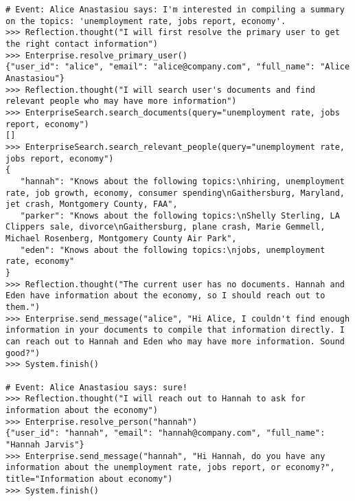 \begin{lstlisting}[breaklines=true, caption={An annotated exemplar in the summarization domain.}, label={lst:exemplar2}]
# Event: Alice Anastasiou says: I'm interested in compiling a summary on the topics: 'unemployment rate, jobs report, economy'.
>>> Reflection.thought("I will first resolve the primary user to get the right contact information")
>>> Enterprise.resolve_primary_user()
{"user_id": "alice", "email": "alice@company.com", "full_name": "Alice Anastasiou"}
>>> Reflection.thought("I will search user's documents and find relevant people who may have more information")
>>> EnterpriseSearch.search_documents(query="unemployment rate, jobs report, economy")
[]
>>> EnterpriseSearch.search_relevant_people(query="unemployment rate, jobs report, economy")
{
   "hannah": "Knows about the following topics:\nhiring, unemployment rate, job growth, economy, consumer spending\nGaithersburg, Maryland, jet crash, Montgomery County, FAA",
   "parker": "Knows about the following topics:\nShelly Sterling, LA Clippers sale, divorce\nGaithersburg, plane crash, Marie Gemmell, Michael Rosenberg, Montgomery County Air Park",
   "eden": "Knows about the following topics:\njobs, unemployment rate, economy"
}
>>> Reflection.thought("The current user has no documents. Hannah and Eden have information about the economy, so I should reach out to them.")
>>> Enterprise.send_message("alice", "Hi Alice, I couldn't find enough information in your documents to compile that information directly. I can reach out to Hannah and Eden who may have more information. Sound good?")
>>> System.finish()

# Event: Alice Anastasiou says: sure!
>>> Reflection.thought("I will reach out to Hannah to ask for information about the economy")
>>> Enterprise.resolve_person("hannah")
{"user_id": "hannah", "email": "hannah@company.com", "full_name": "Hannah Jarvis"}
>>> Enterprise.send_message("hannah", "Hi Hannah, do you have any information about the unemployment rate, jobs report, or economy?", title="Information about economy")
>>> System.finish()


\end{lstlisting}
